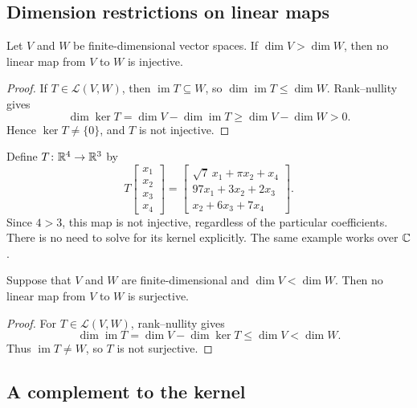 \subsection{Dimension restrictions on linear maps}

\begin{corollary}\label{cor:dimension-obstructs-injectivity}
  Let $V$ and $W$ be finite-dimensional vector spaces. If
  $\dim V>\dim W$, then no linear map from $V$ to $W$ is injective.
\end{corollary}

\begin{proof}
  If $T\in\mathcal L(V,W)$, then $\operatorname{im}T\subseteq W$, so
  $\dim\operatorname{im}T\leq\dim W$. Rank--nullity gives
  \[
    \dim\ker T
      =\dim V-\dim\operatorname{im}T
      \geq\dim V-\dim W>0.
  \]
  Hence $\ker T\neq\{0\}$, and $T$ is not injective.
\end{proof}

\begin{example}
  Define $T\colon\mathbb{R}^4\to\mathbb{R}^3$ by
  \[
    T\begin{bmatrix}x_1\\x_2\\x_3\\x_4\end{bmatrix}
      =\begin{bmatrix}
        \sqrt{7}\,x_1+\pi x_2+x_4\\
        97x_1+3x_2+2x_3\\
        x_2+6x_3+7x_4
      \end{bmatrix}.
  \]
  Since $4>3$, this map is not injective, regardless of the particular
  coefficients. There is no need to solve for its kernel explicitly.
  The same example works over $\mathbb{C}$.
\end{example}

\begin{proposition}\label{prop:dimension-obstructs-surjectivity}
  Suppose that $V$ and $W$ are finite-dimensional and
  $\dim V<\dim W$. Then no linear map from $V$ to $W$ is surjective.
\end{proposition}

\begin{proof}
  For $T\in\mathcal L(V,W)$, rank--nullity gives
  \[
    \dim\operatorname{im}T
      =\dim V-\dim\ker T
      \leq\dim V<\dim W.
  \]
  Thus $\operatorname{im}T\neq W$, so $T$ is not surjective.
\end{proof}

\subsection{A complement to the kernel}

